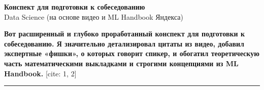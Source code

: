 \documentclass[12pt]{article}
\begin{document}
	
	\begin{center}
		{\huge\bfseries\color{primary} Конспект для подготовки к собеседованию} \\
		\vspace{0.5em}
		{\large Data Science (на основе видео и ML Handbook Яндекса)}
	\end{center}
	
	\vspace{1em}
	\noindent \textbf{Вот расширенный и глубоко проработанный конспект для подготовки к собеседованию. Я значительно детализировал цитаты из видео, добавил экспертные «фишки», о которых говорит спикер, и обогатил теоретическую часть математическими выкладками и строгими концепциями из ML Handbook.} [cite: 1, 2]
	
	\hrule
	\vspace{1.5em}
	
\end{document}
